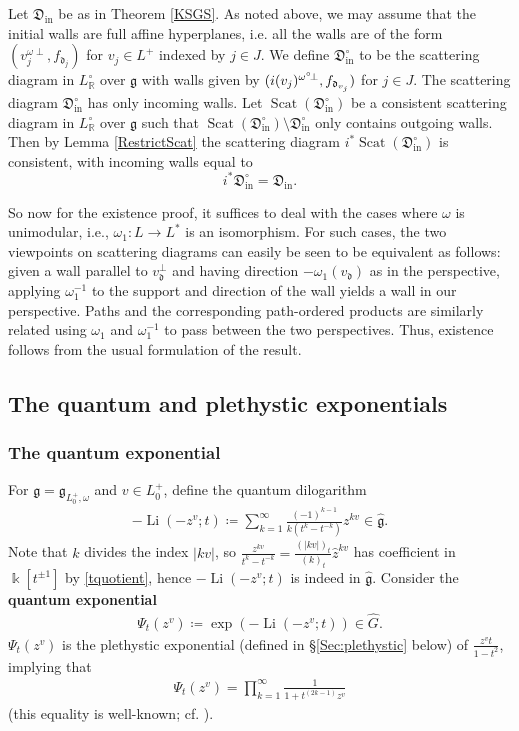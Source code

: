 \documentclass{amsart}
\DeclareMathOperator{\In}{in}
\DeclareMathOperator{\Li}{Li}
\DeclareMathOperator{\scat}{Scat}
\def\!{\mskip-\thinmuskip}
\let\bb=\mathbb
\let\rar=\rightarrow
\let\f=\mathfrak
\newcommand {\kk} {\Bbbk}
\theoremstyle{plain}%
\theoremstyle{definition}
\theoremstyle{remark}
\begin{document}
Let $\f{D}_{\In}$ be as in Theorem \ref{KSGS}.  As noted above, we may assume that the initial walls are full affine hyperplanes, i.e. all the walls are of the form $(v_j^{\omega\perp},f_{\f{d}_j})$ for $v_j\in L^+$ indexed by $j\in J$.  We define $\f{D}_{\In}^{\circ}$ to be the scattering diagram in $L^{\circ}_{\bb{R}}$ over $\f{g}$ with walls given by $(i(v_j)^{\omega^{\circ}\!\perp},f_{\f{d}_{v_j}})$ for $j\in J$.  The scattering diagram $\f{D}^{\circ}_{\In}$ has only incoming walls.  Let $\scat(\f{D}_{\In}^{\circ})$ be a consistent scattering diagram in $L^{\circ}_{\bb{R}}$ over $\f{g}$ such that $\scat(\f{D}_{\In}^{\circ})\setminus \f{D}^{\circ}_{\In}$ only contains outgoing walls.  Then by Lemma \ref{RestrictScat} the scattering diagram $i^* \scat(\f{D}_{\In}^{\circ})$ is consistent, with incoming walls equal to 
\[
i^*\f{D}^{\circ}_{\In}=\f{D}_{\In}.
\]



So now for the existence proof, it suffices to deal with the cases where $\omega$ is unimodular, i.e., $\omega_1\colon L\rar L^*$ is an isomorphism.  For such cases, the two viewpoints on scattering diagrams can easily be seen to be equivalent as follows: given a wall parallel to $v_{\f{d}}^{\perp}$ and having direction $-\omega_1(v_{\f{d}})$ as in the \cite{GHKK} perspective, applying $\omega_1^{-1}$ to the support and direction of the wall yields a wall in our perspective.  Paths and the corresponding path-ordered products are similarly related using $\omega_1$ and $\omega_1^{-1}$ to pass between the two perspectives.  Thus, existence follows from the usual formulation of the result.



\subsection{The quantum and plethystic exponentials}\label{pleth_sec}


\subsubsection{The quantum exponential}
 For $\f{g}=\f{g}_{L_0^+,\omega}$ and $v\in L_0^+$, define the quantum dilogarithm
\begin{align}\label{Li}
    -\Li(-z^v;t)\coloneqq \sum_{k=1}^{\infty} \frac{(-1)^{k-1}}{k(t^k-t^{-k})} z^{kv}\in \hat{\f{g}}.
\end{align}
Note that $k$ divides the index $|kv|$, so $\frac{z^{kv}}{t^k-t^{-k}}=\frac{(|kv|)_t}{(k)_t}\hat{z}^{kv}$ has coefficient in $\kk[t^{\pm 1}]$ by \eqref{tquotient}, hence $-\Li(-z^v;t)$ is indeed in $\hat{\f{g}}$.  Consider the \textbf{quantum exponential} 
\begin{align*}
    \Psi_t(z^v)\coloneqq \exp(-\Li(-z^v;t))\in \hat{G}.
\end{align*}
$\Psi_t(z^v)$ is the plethystic exponential (defined in \S \ref{Sec:plethystic} below) of $\frac{z^vt}{1-t^2}$, implying that
\begin{align}\label{Psit}
    \Psi_t(z^v)=\prod_{k=1}^{\infty} \frac{1}{1+t^{(2k-1)}z^{v}}
\end{align}
(this equality is well-known; cf. \cite[Lem. 8]{Kir}).
 
\end{document}
